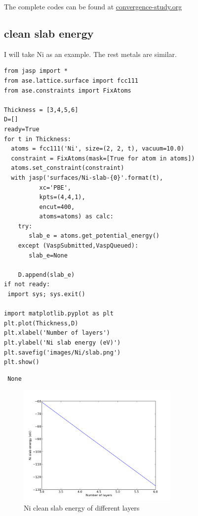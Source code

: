 \documentclass[11pt]{article}
\begin{document}
The complete codes can be found at \href{https://github.com/yichuns/Finalproject/blob/master/convergence-study.org}{convergence-study.org}
\subsection{clean slab energy}
\label{sec-3-3}

I will take Ni as an example. The rest metals are similar.

\begin{verbatim}
from jasp import *
from ase.lattice.surface import fcc111
from ase.constraints import FixAtoms

Thickness = [3,4,5,6]
D=[]
ready=True
for t in Thickness:
  atoms = fcc111('Ni', size=(2, 2, t), vacuum=10.0)
  constraint = FixAtoms(mask=[True for atom in atoms])
  atoms.set_constraint(constraint)
  with jasp('surfaces/Ni-slab-{0}'.format(t),
          xc='PBE',
          kpts=(4,4,1),
          encut=400,
          atoms=atoms) as calc:
    try:
       slab_e = atoms.get_potential_energy()
    except (VaspSubmitted,VaspQueued):
       slab_e=None

    D.append(slab_e)
if not ready:
 import sys; sys.exit()

import matplotlib.pyplot as plt
plt.plot(Thickness,D)
plt.xlabel('Number of layers')
plt.ylabel('Ni slab energy (eV)')
plt.savefig('images/Ni/slab.png')
plt.show()
\end{verbatim}

\begin{verbatim}
 None
\end{verbatim}
\begin{figure}[H]
\centering
\includegraphics[width=0.7\textwidth]{./images/Ni/slab.png}
\caption{Ni clean slab energy of different layers}
\end{figure}
\end{document}
